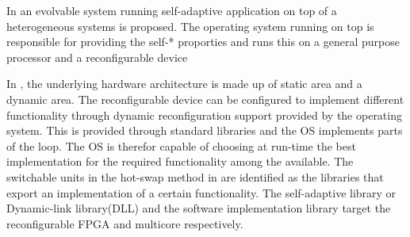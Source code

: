 In \cite{evolvable} an evolvable system running self-adaptive application on top of a heterogeneous systems is proposed. 
The operating system running on top is responsible for providing the self-* proporties and runs this on a general purpose processor and a reconfigurable device 

In \cite{evolvable}, the underlying hardware architecture is made up of  static area and a dynamic area. The reconfigurable device can be configured to implement different functionality through dynamic reconfiguration support provided by the operating system. This is provided through standard libraries and the OS implements parts of the loop. The OS is therefor capable of choosing at run-time the best implementation for the required functionality among the available.
The switchable units in the hot-swap method in \cite{evolvable} are identified as the libraries that export an implementation of a certain functionality. 
The self-adaptive library or Dynamic-link library(DLL) and the software implementation library target the reconfigurable FPGA and multicore respectively. 
